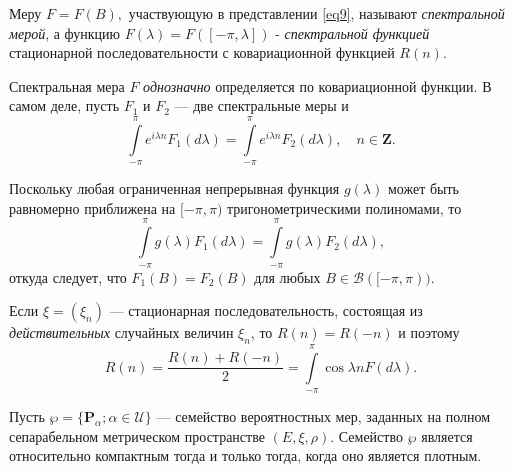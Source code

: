 \begin{remark}
Меру $F = F(B),$ участвующую в представлении \ref{eq9}, называют \textit{спектральной мерой}, а функцию $F(\lambda)=F([-\pi, \lambda])$ - \textit{спектральной функцией} стационарной последовательности с ковариационной функцией $R(n).$
\end{remark}

\begin{remark}
Спектральная мера $F$ \textit{однозначно} определяется по ковариационной функции. В самом деле, пусть $F_1$ и $F_2$ --- две спектральные меры и 
$$\int\limits_{-\pi}^{\pi} e^{i \lambda n} F_1(d \lambda) = \int\limits_{-\pi}^{\pi} e^{i \lambda n} F_2(d \lambda), \quad n \in \mathbf{Z}.$$

Поскольку любая ограниченная непрерывная функция $g(\lambda)$ может быть равномерно приближена на $[-\pi, \pi)$ тригонометрическими полиномами, то 
$$\int\limits_{-\pi}^{\pi} g(\lambda)F_1(d\lambda) = \int\limits_{-\pi}^{\pi} g(\lambda)F_2(d\lambda),$$
откуда следует, что $F_1(B) = F_2(B)$ для любых $B \in \mathcal{B}([-\pi, \pi)).$
\end{remark}
\begin{remark}
Если $\xi = (\xi_n)$ --- стационарная последовательность, состоящая из \textit{действительных} случайных величин $\xi_n$, то $R(n)=R(-n)$ и поэтому
$$R(n)= \frac{R(n) + R(-n)}{2} = \int\limits_{-\pi}^{\pi} \cos \lambda n F(d\lambda).$$

\end{remark}

\begin{theorem}[Прохорова]
    Пусть $\wp = \{ \mathbf{P}_\alpha; \alpha \in  \mathcal{U} \}$ --- семейство вероятностных мер, заданных на полном сепарабельном метрическом пространстве $(E, \xi, \rho)$. Семейство $\wp$ является относительно компактным тогда и только тогда, когда оно является плотным.
\end{theorem}

